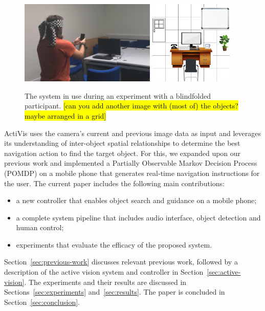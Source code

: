 \documentclass[runningheads]{llncs}
\DeclareRobustCommand{\tofix}[1]{{\sethlcolor{yellow}\hl{[#1]}}}
\begin{document}
\begin{figure}
  \centering
  \includegraphics[height=4cm]{figures/system_use.png} \hfil
  \includegraphics[height=4cm]{figures/object_grid/grid.png}
  \caption{The system in use during an experiment with a blindfolded participant. \tofix{can you add another image with (most of) the objects? maybe arranged in a grid} }\label{fig:system-in-use}
\end{figure}

ActiVis uses the camera's current and previous image data as input and leverages its understanding of inter-object spatial relationships to determine the best navigation action to find the target object.
For this, we expanded upon our previous work and implemented a Partially Observable Markov Decision Process (POMDP) on a mobile phone that generates real-time navigation instructions for the user.
The current paper includes the following main contributions:

\begin{itemize}
  \item a new controller that enables object search and guidance on a mobile phone;
  \item a complete system pipeline that includes audio interface, object detection and human control;
  \item experiments that evaluate the efficacy of the proposed system.
\end{itemize}

Section~\ref{sec:previous-work} discusses relevant previous work, followed by a description of the active vision system and controller in Section~\ref{sec:active-vision}.
The experiments and their results are discussed in Sections~\ref{sec:experiments} and~\ref{sec:results}.
The paper is concluded in Section~\ref{sec:conclusion}.
\end{document}
